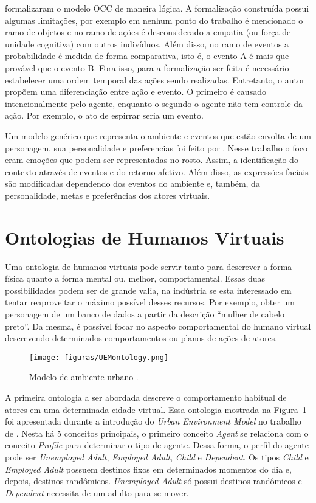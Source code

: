 \citet{adam2009alfototoe} formalizaram o modelo OCC de maneira lógica. A
formalização construída possui algumas limitações, por exemplo em nenhum ponto
do trabalho é mencionado o ramo de objetos e no ramo de ações é desconsiderado
a empatia (ou força de unidade cognitiva) com outros indivíduos. Além disso,
no ramo de eventos a probabilidade é medida de forma comparativa, isto é, o
evento A é mais que provável que o evento B. Fora isso, para a formalização
ser feita é necessário estabelecer uma ordem temporal das ações sendo
realizadas. Entretanto, o autor propõem uma diferenciação entre ação e evento.
O primeiro é causado intencionalmente pelo agente, enquanto o segundo o agente
não tem controle da ação. Por exemplo, o ato de espirrar seria um evento.

Um modelo genérico que representa o ambiente e eventos que estão envolta de um
personagem, sua personalidade e preferencias foi feito por
\citet{lera2009semantic}. Nesse trabalho o foco eram emoções
que podem ser representadas no rosto. Assim, a identificação do contexto
através de eventos e do retorno afetivo. Além disso, as expressões faciais são
modificadas dependendo dos eventos do ambiente e, também, da personalidade,
metas e preferências dos atores virtuais.


\section{Ontologias de Humanos Virtuais} \label{cap:eda:odhv}

Uma ontologia de humanos virtuais pode servir tanto para descrever a forma
física quanto a forma mental ou, melhor, comportamental. Essas duas
possibilidades podem ser de grande valia, na indústria se esta interessado em
tentar reaproveitar o máximo possível desses recursos. Por exemplo, obter um
personagem de um banco de dados a partir da descrição ``mulher de cabelo
preto''. Da mesma, é possível focar no aspecto comportamental do humano
virtual descrevendo determinados comportamentos ou planos de ações de atores.

\begin{figure}[t]
  \centering
    \texttt{[image: figuras/UEMontology.png]}
  \caption{Modelo de ambiente urbano \cite{paiva2005ontology}.}
  \label{fig:UEM}
\end{figure}

A primeira ontologia a ser abordada descreve o comportamento habitual de
atores em uma determinada cidade virtual. Essa ontologia mostrada na
Figura~\ref{fig:UEM} foi apresentada durante a introdução do \emph{Urban
Environment Model} no trabalho de \citet{paiva2005ontology}. Nesta há 5
conceitos principais, o primeiro conceito \emph{Agent} se relaciona com o
conceito \emph{Profile} para determinar o tipo de agente. Dessa forma, o
perfil do agente pode ser \emph{Unemployed Adult}, \emph{Employed Adult},
\emph{Child} e \emph{Dependent}. Os tipos \emph{Child} e \emph{Employed Adult}
possuem destinos fixos em determinados momentos do dia e, depois, destinos
randômicos. \emph{Unemployed Adult} só possui destinos randômicos e
\emph{Dependent} necessita de um adulto para se mover.

